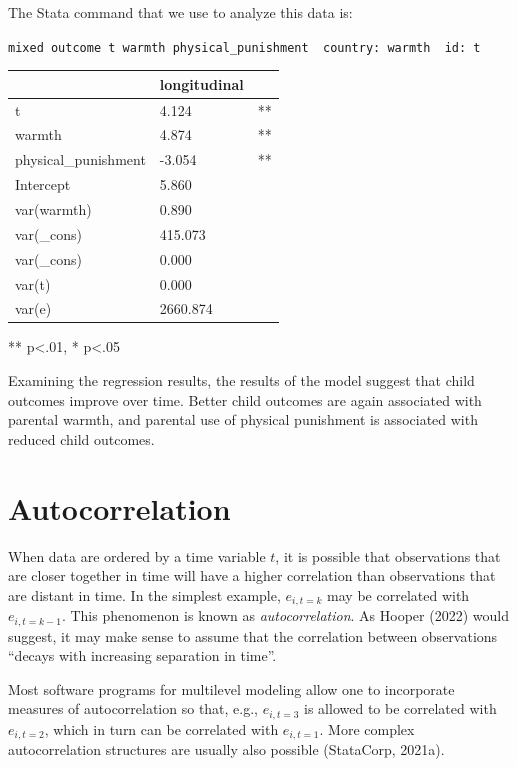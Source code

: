 \documentclass[
  letterpaper,
  DIV=11,
  numbers=noendperiod]{scrreprt}
\begin{document}
The Stata command that we use to analyze this data is:

\texttt{mixed\ outcome\ t\ warmth\ physical\_punishment\ \textbar{}\textbar{}\ country:\ warmth\ \textbar{}\textbar{}\ id:\ t}

\begin{longtable}[]{@{}lll@{}}
\toprule()
& longitudinal & \\
\midrule()
\endhead
t & 4.124 & ** \\
warmth & 4.874 & ** \\
physical\_punishment & -3.054 & ** \\
Intercept & 5.860 & \\
var(warmth) & 0.890 & \\
var(\_cons) & 415.073 & \\
var(\_cons) & 0.000 & \\
var(t) & 0.000 & \\
var(e) & 2660.874 & \\
\bottomrule()
\end{longtable}

** p\textless.01, * p\textless.05

Examining the regression results, the results of the model suggest that
child outcomes improve over time. Better child outcomes are again
associated with parental warmth, and parental use of physical punishment
is associated with reduced child outcomes.

\hypertarget{autocorrelation}{%
\section{Autocorrelation}\label{autocorrelation}}

When data are ordered by a time variable \(t\), it is possible that
observations that are closer together in time will have a higher
correlation than observations that are distant in time. In the simplest
example, \(e_{i, t=k}\) may be correlated with \(e_{i, t=k-1}\). This
phenomenon is known as \emph{autocorrelation}. As Hooper (2022) would
suggest, it may make sense to assume that the correlation between
observations ``decays with increasing separation in time''.

Most software programs for multilevel modeling allow one to incorporate
measures of autocorrelation so that, e.g., \(e_{i,t=3}\) is allowed to
be correlated with \(e_{i,t=2}\), which in turn can be correlated with
\(e_{i,t=1}\). More complex autocorrelation structures are usually also
possible (StataCorp, 2021a).
\end{document}
